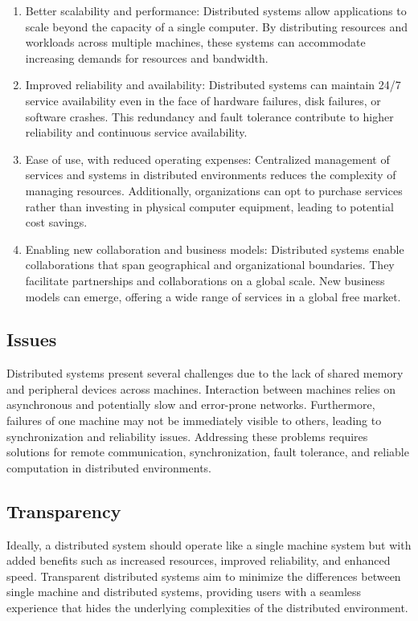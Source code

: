 \documentclass{report}
\begin{document}
\begin{enumerate}[label=\textit{(\roman*)}]
\item Better scalability and performance: Distributed systems allow applications to scale beyond
  the capacity of a single computer. By distributing resources and workloads across multiple machines,
  these systems can accommodate increasing demands for resources and bandwidth.
\item Improved reliability and availability: Distributed systems can maintain 24/7 service
  availability even in the face of hardware failures, disk failures, or software crashes. This
  redundancy and fault tolerance contribute to higher reliability and continuous service availability.
\item Ease of use, with reduced operating expenses: Centralized management of services and
  systems in distributed environments reduces the complexity of managing resources. Additionally,
  organizations can opt to purchase services rather than investing in physical computer equipment,
  leading to potential cost savings.
\item Enabling new collaboration and business models: Distributed systems enable collaborations
  that span geographical and organizational boundaries. They facilitate partnerships and
  collaborations on a global scale. New business models can emerge, offering a wide range of services
  in a global free market.
\end{enumerate}


\subsection{Issues}
Distributed systems present several challenges due to the lack of shared memory and peripheral
devices across machines. Interaction between machines relies on asynchronous and potentially slow
and error-prone networks. Furthermore, failures of one machine may not be immediately visible to
others, leading to synchronization and reliability issues. Addressing these problems requires
solutions for remote communication, synchronization, fault tolerance, and reliable computation in
distributed environments.


\subsection{Transparency}
Ideally, a distributed system should operate like a single machine system but with added benefits
such as increased resources, improved reliability, and enhanced speed. Transparent distributed
systems aim to minimize the differences between single machine and distributed systems, providing
users with a seamless experience that hides the underlying complexities of the distributed
environment.
\end{document}
